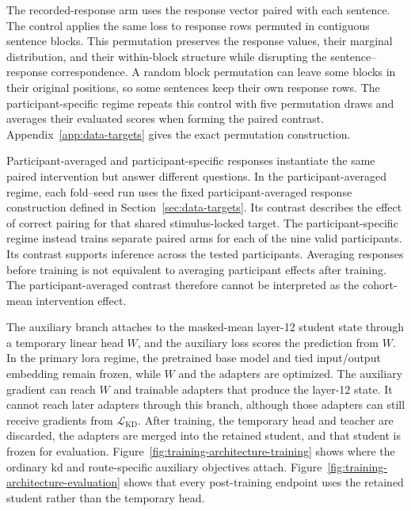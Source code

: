The recorded-response arm uses the response vector paired with each sentence.
The control applies the same loss to response rows permuted in contiguous sentence blocks.
This permutation preserves the response values, their marginal distribution, and their within-block structure while disrupting the sentence--response correspondence.
A random block permutation can leave some blocks in their original positions, so some sentences keep their own response rows.
The participant-specific regime repeats this control with five permutation draws and averages their evaluated scores when forming the paired contrast.
Appendix~\ref{app:data-targets} gives the exact permutation construction.

Participant-averaged and participant-specific responses instantiate the same paired intervention but answer different questions.
In the participant-averaged regime, each fold--seed run uses the fixed participant-averaged response construction defined in Section~\ref{sec:data-targets}.
Its contrast describes the effect of correct pairing for that shared stimulus-locked target.
The participant-specific regime instead trains separate paired arms for each of the nine valid participants.
Its contrast supports inference across the tested participants.
Averaging responses before training is not equivalent to averaging participant effects after training.
The participant-averaged contrast therefore cannot be interpreted as the cohort-mean intervention effect.

The auxiliary branch attaches to the masked-mean layer-12 student state through a temporary linear head \(W\), and the auxiliary loss scores the prediction from \(W\).
In the primary \ac{lora} regime, the pretrained base model and tied input/output embedding remain frozen, while \(W\) and the adapters are optimized.
The auxiliary gradient can reach \(W\) and trainable adapters that produce the layer-12 state.
It cannot reach later adapters through this branch, although those adapters can still receive gradients from \(\mathcal L_{\mathrm{KD}}\).
After training, the temporary head and teacher are discarded, the adapters are merged into the retained student, and that student is frozen for evaluation.
Figure~\ref{fig:training-architecture-training} shows where the ordinary \ac{kd} and route-specific auxiliary objectives attach.
Figure~\ref{fig:training-architecture-evaluation} shows that every post-training endpoint uses the retained student rather than the temporary head.

